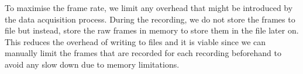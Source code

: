 To maximise the frame rate, we limit any overhead that might be introduced by the data acquisition process. During the recording, we do not store the frames to file but instead, store the raw frames in memory to store them in the file later on. This reduces the overhead of writing to files and it is viable since we can manually limit the frames that are recorded for each recording beforehand to avoid any slow down due to memory limitations.
